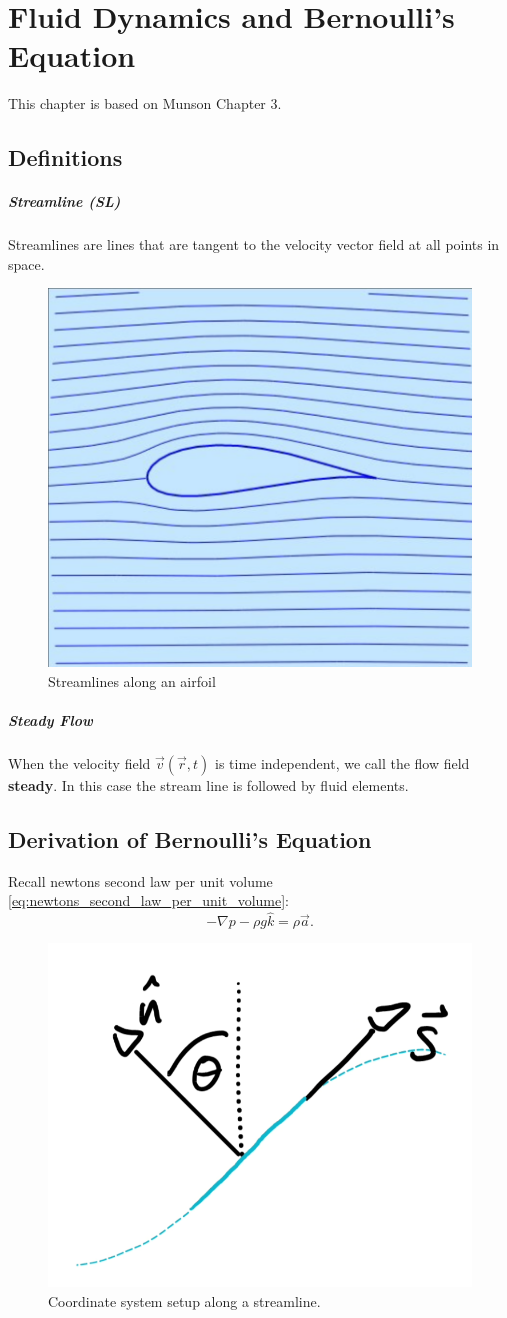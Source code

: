 \chapter{Fluid Dynamics and Bernoulli's Equation}
This chapter is based on Munson Chapter 3.

\section{Definitions}
\paragraph{Streamline (SL)}
Streamlines are lines that are tangent to the velocity vector field at all points in space.

\begin{figure}[H]
	\centering
	\includegraphics[width=0.3\linewidth]{Sketches/Airfoil}
	\caption{Streamlines along an airfoil}
	\label{fig:airfoil}
\end{figure}

\paragraph{Steady Flow}
When the velocity field $\vec v(\vec r, t)$ is time independent, we call the flow field \textbf{steady}. In this case the stream line is followed by fluid elements.


\section{Derivation of Bernoulli's Equation}

Recall newtons second law per unit volume \eqref{eq:newtons_second_law_per_unit_volume}:
\begin{equation*}
	-\nabla p - \rho g \hat k = \rho \vec a.
\end{equation*}

\begin{figure}[H]
	\centering
	\includegraphics[width=0.3\linewidth]{Sketches/AlongStreamline}
	\caption{Coordinate system setup along a streamline.}
	\label{fig:alongstreamline}
\end{figure}

